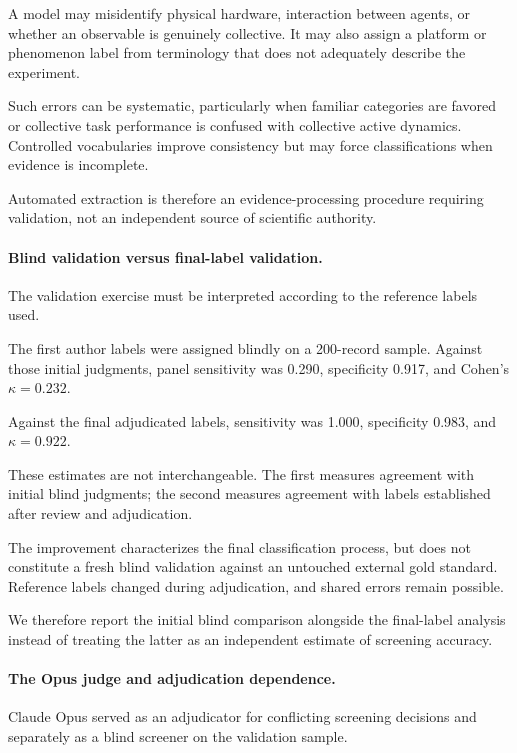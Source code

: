 A model may misidentify physical
hardware, interaction between agents,
or whether an observable is genuinely
collective. It may also assign
a platform or phenomenon label
from terminology that does not
adequately describe the experiment.

Such errors can be systematic,
particularly when familiar categories
are favored or collective task
performance is confused with
collective active dynamics.
Controlled vocabularies improve
consistency but may force
classifications when evidence
is incomplete.

Automated extraction is therefore
an evidence-processing procedure
requiring validation, not an
independent source of
scientific authority.

\paragraph*{Blind validation versus final-label validation.}

The validation exercise must be interpreted
according to the reference labels used.

The first author labels were assigned
blindly on a 200-record sample.
Against those initial judgments,
panel sensitivity was 0.290,
specificity 0.917, and
Cohen's $\kappa=0.232$.

Against the final adjudicated labels,
sensitivity was 1.000,
specificity 0.983, and
$\kappa=0.922$.

These estimates are not interchangeable.
The first measures agreement with
initial blind judgments; the second
measures agreement with labels
established after review and
adjudication.

The improvement characterizes the
final classification process, but
does not constitute a fresh blind
validation against an untouched
external gold standard. Reference
labels changed during adjudication,
and shared errors remain possible.

We therefore report the initial
blind comparison alongside the
final-label analysis instead of
treating the latter as an
independent estimate of screening
accuracy.

\paragraph*{The Opus judge and adjudication dependence.}

Claude Opus served as an adjudicator
for conflicting screening decisions
and separately as a blind screener
on the validation sample.

